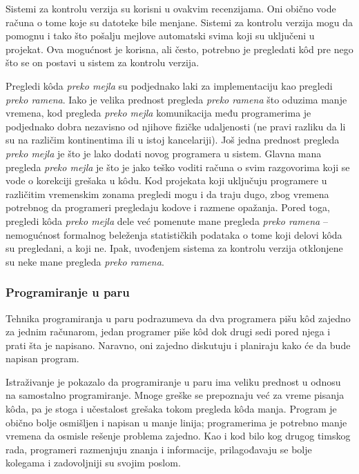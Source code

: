 \documentclass[a4paper]{article}
\begin{document}
    Sistemi za kontrolu verzija su korisni u ovakvim recenzijama. Oni obično vode računa o tome koje su datoteke bile menjane. Sistemi za kontrolu verzija mogu da pomognu i tako što pošalju mejlove automatski svima koji su uključeni u projekat. Ova mogućnost je korisna, ali često, potrebno je pregledati kôd pre nego što se on postavi u sistem za kontrolu verzija. \cite{bkspcr}
    
    Pregledi kôda \textit{preko mejla} su podjednako laki za implementaciju kao pregledi \textit{preko ramena}. Iako je velika prednost pregleda \textit{preko ramena} što oduzima manje vremena, kod pregleda \textit{preko mejla} komunikacija među programerima je podjednako dobra nezavisno od njihove fizičke udaljenosti (ne pravi razliku da li su na različim kontinentima ili u istoj kancelariji). Još jedna prednost pregleda \textit{preko mejla} je što je lako dodati novog programera u sistem. Glavna mana pregleda \textit{preko mejla} je što je jako teško voditi računa o svim razgovorima koji se vode o korekciji grešaka u kôdu. Kod projekata koji uključuju programere u različitim vremenskim zonama pregledi mogu i da traju dugo, zbog vremena potrebnog da programeri pregledaju kodove i razmene opažanja. Pored toga, pregledi kôda \textit{preko mejla} dele već pomenute mane pregleda \textit{preko ramena} -- nemogućnost formalnog beleženja statističkih podataka o tome koji delovi kôda su pregledani, a koji ne. Ipak, uvođenjem sistema za kontrolu verzija otklonjene su neke mane pregleda \textit{preko ramena}. \cite{bkspcr}
    
    \subsubsection{Programiranje u paru}
    Tehnika programiranja u paru podrazumeva da dva programera pišu kôd zajedno za jednim računarom, jedan programer piše kôd dok drugi sedi pored njega i prati šta je napisano. Naravno, oni zajedno diskutuju i planiraju kako će da bude napisan program.
    
    Istraživanje je pokazalo da programiranje u paru ima veliku prednost u odnosu na samostalno programiranje. \cite{Cockburn00thecosts} Mnoge greške se prepoznaju već za vreme pisanja kôda, pa je stoga i učestalost grešaka tokom pregleda kôda manja. Program je obično bolje osmišljen i napisan u manje linija; programerima je potrebno manje vremena da osmisle rešenje problema zajedno. Kao i kod bilo kog drugog timskog rada, programeri razmenjuju znanja i informacije, prilagođavaju se bolje kolegama i zadovoljniji su svojim poslom.
    
\end{document}
